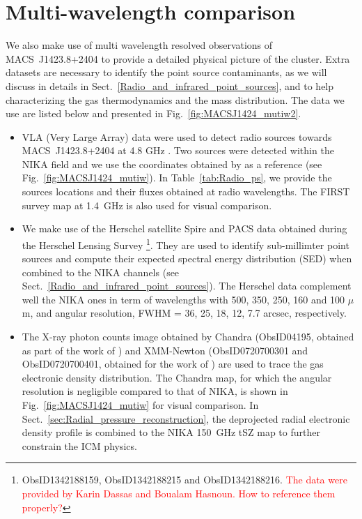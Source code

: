 \documentclass[twocolumn,traditabstract]{aa}
\begin{document}
\section{Multi-wavelength comparison}\label{sec:Multi_wavelength_comparison}
We also make use of multi wavelength resolved observations of \mbox{MACS~J1423.8+2404} to provide a detailed physical picture of the cluster. Extra datasets are necessary to identify the point source contaminants, as we will discuss in details in Sect.~\ref{Radio_and_infrared_point_sources}, and to help characterizing the gas thermodynamics and the mass distribution. The data we use are listed below and presented in Fig.~\ref{fig:MACSJ1424_mutiw2}.
\begin{itemize}
\item VLA (Very Large Array) data were used to detect radio sources towards \mbox{MACS~J1423.8+2404} at 4.8 GHz \citep{laroque2003}. Two sources were detected within the NIKA field and we use the coordinates obtained by \cite{laroque2003} as a reference (see Fig.~\ref{fig:MACSJ1424_mutiw}). In Table~\ref{tab:Radio_ps}, we provide the sources locations and their fluxes obtained at radio wavelengths. The FIRST survey map at 1.4~GHz \citep[Faint Images of the Radio Sky at Twenty-Centimeters,][]{becker1995} is also used for visual comparison.
\item We make use of the Herschel satellite Spire \citep{griffin2010} and PACS \citep{poglitsch2010} data obtained during the Herschel Lensing Survey \citep[HLS,][]{egami2010,rawle2012}\footnote{ObsID1342188159, ObsID1342188215 and ObsID1342188216. \textcolor{red}{The data were provided by Karin Dassas and Boualam Hasnoun. How to reference them properly?}}. They are used to identify sub-millimter point sources and compute their expected spectral energy distribution (SED) when combined to the NIKA channels (see Sect.~\ref{Radio_and_infrared_point_sources}). The Herschel data complement well the NIKA ones in term of wavelengths with 500, 350, 250, 160 and 100 $\mu$m, and angular resolution, FWHM = 36, 25, 18, 12, 7.7 arcsec, respectively.
\item The X-ray photon counts image obtained by Chandra (ObsID04195, obtained as part of the work of \cite{allen2004}) and XMM-Newton (ObsID0720700301 and ObsID0720700401, obtained for the work of \cite{connor2014}) are used to trace the gas electronic density distribution. The Chandra map, for which the angular resolution is negligible compared to that of NIKA, is shown in Fig.~\ref{fig:MACSJ1424_mutiw} for visual comparison. In Sect.~\ref{sec:Radial_pressure_reconstruction}, the deprojected radial electronic density profile \citep[see][ for the methodology]{croston2006} is combined to the NIKA 150~GHz tSZ map to further constrain the ICM physics.

\end{itemize}
\end{document}
